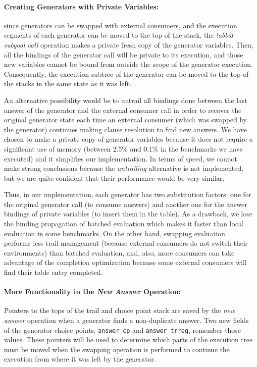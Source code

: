 \documentclass{./tlp}
\newcommand{\redsect}{\vspace{-1em}}
\begin{document}
\redsect
\paragraph{\textbf{Creating Generators with Private Variables:} }
since generators can be swapped with external consumers, and the
execution segments of each generator can be moved to the top of the
stack, the \emph{tabled subgoal call} operation makes a private fresh
copy of the generator variables.  Then, all the bindings of the
generator call will be private to its execution, and those new
variables cannot be bound from outside the scope of the generator
execution.  Consequently, the execution subtree of the generator can
be moved to the top of the stacks in the same state as it was left.

An alternative possibility would be to untrail all bindings done
between the last answer of the generator and the external consumer
call in order to recover the original generator state each time an
external consumer (which was swapped by the generator) continues
making clause resolution to find new answers.  We have chosen to make
a private copy of generator variables because it does not require a
significant use of memory (between 2.5\% and 0.1\% in the benchmarks
we have executed) and it simplifies our implementation.  In terms of
speed, we cannot make strong conclusions because the \emph{untrailing}
alternative is not implemented, but we are quite confident that their
performance would be very similar.

Thus, in our implementation, each generator has two substitution
factors: one for the original generator call (to consume answers) and
another one for the answer bindings of private variables (to insert
them in the table). As a drawback, we lose the binding propagation of
batched evaluation which makes it faster than local evaluation in some
benchmarks.  On the other hand, swapping evaluation performs less trail
management (because external consumers do not switch their
environments) than batched evaluation, and, also, more consumers can
take advantage of the completion optimization because some external
consumers will find their table entry completed.

\redsect
\paragraph{\textbf{More Functionality in the \emph{New Answer} Operation:}}

Pointers to the tops of the trail and choice point stack are saved by
the \emph{new answer} operation when a generator finds a non-duplicate
answer. Two new fields of the generator choice points,
\lstinline{answer_cp} and \lstinline{answer_trreg}, remember those
values.  These pointers will be used to determine which parts of the
execution tree must be moved when the swapping operation is performed
to continue the execution from where it was left by the generator.
\end{document}
